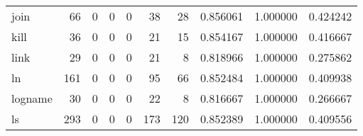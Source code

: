 \begin{longtable}{lrrrrrrrrr}
join      &                                        66 &                                                  0 &                                                  0 &                                                  0 &                                                 38 &                                                 28 &                                           0.856061 &                               1.000000 &                             0.424242 \\
kill      &                                        36 &                                                  0 &                                                  0 &                                                  0 &                                                 21 &                                                 15 &                                           0.854167 &                               1.000000 &                             0.416667 \\
link      &                                        29 &                                                  0 &                                                  0 &                                                  0 &                                                 21 &                                                  8 &                                           0.818966 &                               1.000000 &                             0.275862 \\
ln        &                                       161 &                                                  0 &                                                  0 &                                                  0 &                                                 95 &                                                 66 &                                           0.852484 &                               1.000000 &                             0.409938 \\
logname   &                                        30 &                                                  0 &                                                  0 &                                                  0 &                                                 22 &                                                  8 &                                           0.816667 &                               1.000000 &                             0.266667 \\
ls        &                                       293 &                                                  0 &                                                  0 &                                                  0 &                                                173 &                                                120 &                                           0.852389 &                               1.000000 &                             0.409556 \\

\end{longtable}
